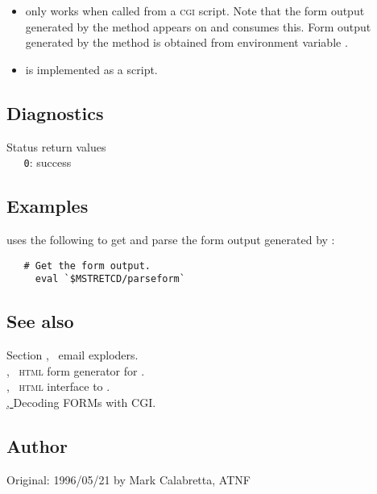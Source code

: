 \begin{itemize}
\item
    only works when called from a \textsc{cgi} script.  Note
   that the form output generated by the  method appears on
    and  consumes this.  Form output generated by
   the  method is obtained from environment variable
   .

\item
    is implemented as a  script.
\end{itemize}
 
\subsection*{Diagnostics}
 
Status return values
\\ \verb+   0+: success

\subsection*{Examples}

 uses the following to get and parse the form output generated
by :

\begin{verbatim}
   # Get the form output.
     eval `$MSTRETCD/parseform`
\end{verbatim}
 
\subsection*{See also}
 
Section , \aipspp\ email exploders.\\
, \aipspp\ \textsc{html} form generator for .\\
, \aipspp\ \textsc{html} interface to .\\
\href{http://hoohoo.ncsa.uiuc.edu/cgi/forms.html}{, }
   {Decoding FORMs with CGI}.
 
\subsection*{Author}
 
Original: 1996/05/21 by Mark Calabretta, ATNF


